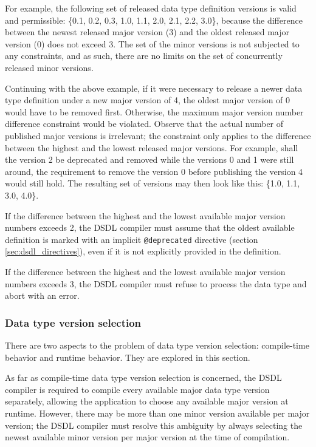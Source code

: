 For example, the following set of released data type definition versions is valid and permissible:
\{0.1, 0.2, 0.3, 1.0, 1.1, 2.0, 2.1, 2.2, 3.0\},
because the difference between the newest released major version (3) and the oldest released major version (0)
does not exceed 3.
The set of the minor versions is not subjected to any constraints,
and as such, there are no limits on the set of concurrently released minor versions.

Continuing with the above example, if it were necessary to release a newer data type definition
under a new major version of 4, the oldest major version of 0 would have to be removed first.
Otherwise, the maximum major version number difference constraint would be violated.
Observe that the actual number of published major versions is irrelevant;
the constraint only applies to the difference between the highest and the lowest released major versions.
For example, shall the version 2 be deprecated and removed while the versions 0 and 1 were still around,
the requirement to remove the version 0 before publishing the version 4 would still hold.
The resulting set of versions may then look like this:
\{1.0, 1.1, 3.0, 4.0\}.

If the difference between the highest and the lowest available major version numbers exceeds 2,
the DSDL compiler must assume that the oldest available definition is marked with an implicit
\verb|@deprecated| directive (section \ref{sec:dsdl_directives}),
even if it is not explicitly provided in the definition.

If the difference between the highest and the lowest available major version numbers exceeds 3,
the DSDL compiler must refuse to process the data type and abort with an error.

\subsubsection{Data type version selection}

There are two aspects to the problem of data type version selection:
compile-time behavior and runtime behavior.
They are explored in this section.

As far as compile-time data type version selection is concerned,
the DSDL compiler is required to compile every available major data type version separately,
allowing the application to choose any available major version at runtime.
However, there may be more than one minor version available per major version;
the DSDL compiler must resolve this ambiguity by always selecting the newest available minor
version per major version at the time of compilation.

